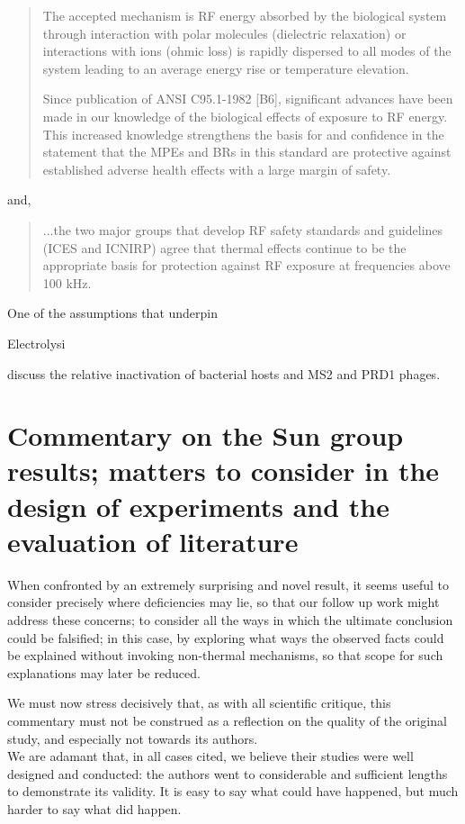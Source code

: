 \documentclass[paper.tex]{subfiles}
\begin{document}
\begin{multicols}{1}
\begin{quote}
	The accepted mechanism is RF energy absorbed by the biological system through interaction with polar molecules (dielectric relaxation) or interactions with ions (ohmic loss) is rapidly dispersed to all modes of the system leading to an average energy rise or temperature elevation. 
	
	Since publication of ANSI C95.1-1982 [B6], significant advances have been made in our knowledge of the biological effects of exposure to RF energy. This increased knowledge strengthens the basis for and confidence in the statement that the MPEs and BRs in this	standard are protective against established adverse health effects with a large margin of safety.
\end{quote}

and, 

\begin{quote}
	...the two major groups that develop RF safety standards and
	guidelines (ICES and ICNIRP) agree that thermal effects continue to be the appropriate basis for protection
	against RF exposure at frequencies above 100 kHz.
\end{quote}



One of the assumptions that underpin 



Electrolysi


\cite{comparative2003} discuss the relative inactivation of bacterial hosts and MS2 and PRD1 phages. 



\clearpage
\end{multicols}
\section{Commentary on the Sun group results; matters to consider in the design of experiments and the evaluation of literature}

When confronted by an extremely surprising and novel result, it seems useful to consider precisely where deficiencies may lie, so that our follow up work might address these concerns; to consider all the ways in which the ultimate conclusion could be falsified; in this case, by exploring what ways the observed facts could be explained without invoking non-thermal mechanisms, so that scope for such explanations may later be reduced.



\begin{toolchain}
We must now stress decisively that, as with all scientific critique, this commentary must not be construed as a reflection on the quality of the original study, and especially not towards its authors.\\ 

We are adamant that, in all cases cited, we believe their studies were well designed and conducted: the authors went to considerable and sufficient lengths to demonstrate its validity. It is easy to say what could have happened, but much harder to say what did happen.
\end{toolchain}
\end{document}
